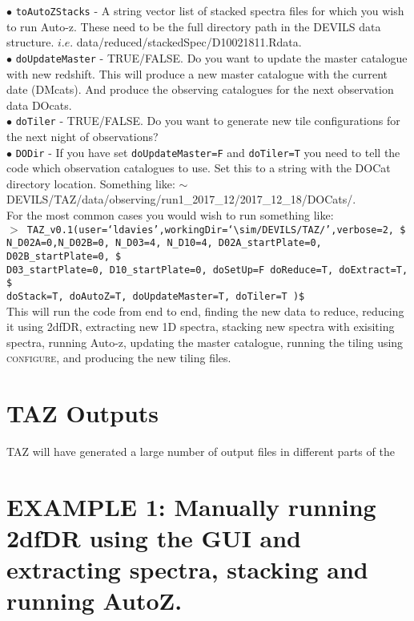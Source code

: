 \documentclass[12pt]{article}
\begin{document}
$\bullet$ \texttt{toAutoZStacks} - A string vector list of stacked spectra files for which you wish to run Auto-z. These need to be the full directory path in the DEVILS data structure. $i.e.$ data/reduced/stackedSpec/D10021811.Rdata. \\
$\bullet$ \texttt{doUpdateMaster} - TRUE/FALSE. Do you want to update the master catalogue with new redshift. This will produce a new master catalogue with the current date (DMcats). And produce the observing catalogues for the next observation data DOcats. \\ 
$\bullet$ \texttt{doTiler} -  TRUE/FALSE. Do you want to generate new tile configurations for the next night of observations? \\
$\bullet$ \texttt{DODir} - If you have set \texttt{doUpdateMaster=F} and \texttt{doTiler=T} you need to tell the code which observation catalogues to use. Set this to a string with the DOCat directory location. Something like: $\sim$DEVILS/TAZ/data/observing/run1\_2017\_12/2017\_12\_18/DOCats/.\\

For the most common cases you would wish to run something like: \\

\hspace{10mm} \texttt{$>$ TAZ\_v0.1(user=`ldavies',workingDir=`$\sim$/DEVILS/TAZ/',verbose=2, \$ \\
N\_D02A=0,N\_D02B=0, N\_D03=4, N\_D10=4, D02A\_startPlate=0, D02B\_startPlate=0, \$ \\ 
D03\_startPlate=0, D10\_startPlate=0, doSetUp=F doReduce=T, doExtract=T,  \$ \\
doStack=T,  doAutoZ=T, doUpdateMaster=T, doTiler=T )\$ }\\

This will run the code from end to end, finding the new data to reduce, reducing it using 2dfDR, extracting new 1D spectra, stacking new spectra with exisiting spectra, running Auto-z, updating the master catalogue, running the tiling using \textsc{configure}, and producing the new tiling files. 

\section{TAZ Outputs}

TAZ will have generated a large number of output files in different parts of the 


\section{EXAMPLE 1: Manually running 2dfDR using the GUI and extracting spectra, stacking and running AutoZ.}
\end{document}
